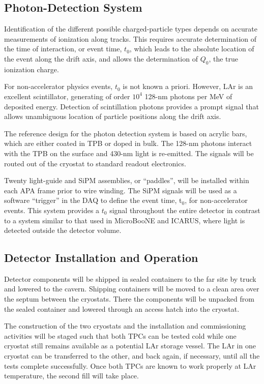 \subsection{Photon-Detection System}

Identification of the different possible charged-particle types depends on accurate measurements of ionization along tracks. This requires accurate determination of the time of interaction, or event time, $t_0$, which leads to the absolute location of the event along the drift axis, and allows the determination of $Q_0$,  the 
true ionization charge.

For non-accelerator physics events, $t_0$ is not known a priori. However, LAr is an excellent scintillator, generating of order $10^{4}$ 128-nm photons per MeV of deposited energy.  Detection of scintillation photons provides a prompt signal that allows unambiguous location of particle positions along the drift axis.

The reference design for the photon detection system is based on acrylic bars, which are either coated in TPB or doped in bulk. The 128-nm photons interact with the TPB on the surface and 430-nm light is re-emitted. The signals will be routed out of the cryostat to standard readout electronics.

Twenty light-guide and SiPM assemblies, or ``paddles'', will be installed within each APA frame prior to wire winding. The SiPM signals will be used as a software ``trigger'' in the DAQ to define the event time, t$_0$, for non-accelerator events. This system provides a $t_0$ signal throughout the entire detector in contrast to a system similar to that used in MicroBooNE and ICARUS, where light is detected outside the detector volume. 

\subsection{Detector Installation and Operation}
\label{sec:det-install}

Detector components will be shipped in sealed containers to the far site by truck and lowered to the cavern. Shipping containers will be moved to a clean area over the septum between the cryostats. There the components will be unpacked from the sealed container and lowered  through an access hatch into the cryostat. 

The construction of the two cryostats and the installation and commissioning activities will be staged such that both TPCs can be tested cold while one cryostat still remains available as a potential LAr storage vessel. The LAr in one cryostat can be transferred to the other, and back again, if necessary, until all the tests complete successfully. Once both TPCs are known to work properly at LAr temperature, the second fill will take place.


